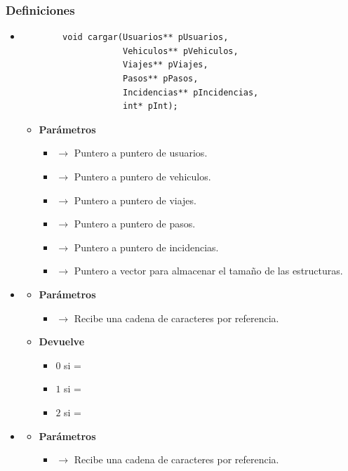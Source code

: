 \subsubsection{Definiciones}
\begin{itemize}
	\item \label{def:cargar}
	\begin{lstlisting}
		void cargar(Usuarios** pUsuarios,
					Vehiculos** pVehiculos,
					Viajes** pViajes,
					Pasos** pPasos,
					Incidencias** pIncidencias,
					int* pInt);
	\end{lstlisting}
	\begin{itemize}
		\item \textbf{Parámetros}
		\begin{itemize}
			\item {} $\rightarrow$ Puntero a puntero de usuarios.
			\item {} $\rightarrow$ Puntero a puntero de vehiculos.
			\item {}$\rightarrow$ Puntero a puntero de viajes.
			\item {}$\rightarrow$ Puntero a puntero de pasos.
			\item {}$\rightarrow$ Puntero a puntero de incidencias.
			\item {}$\rightarrow$ Puntero a vector para almacenar el tamaño de las estructuras.
		\end{itemize}
	\newpage
	\end{itemize}
	\item \label{def:estincidencia}
	\begin{itemize}
		\item \textbf{Parámetros}
		\begin{itemize}
			\item {} $\rightarrow$ Recibe una cadena de caracteres por referencia.
			
		\end{itemize}
		\item \textbf{Devuelve}
		\begin{itemize}
			\item $0$ si  = 
			\item $1$ si  = 
			\item $2$ si  = 
		\end{itemize}
	\end{itemize}
	\item\label{def:estusuario}
	\begin{itemize}
		\item \textbf{Parámetros}
		\begin{itemize}
			\item {} $\rightarrow$ Recibe una cadena de caracteres por referencia.
			

\end{itemize}
\end{itemize}
\end{itemize}
